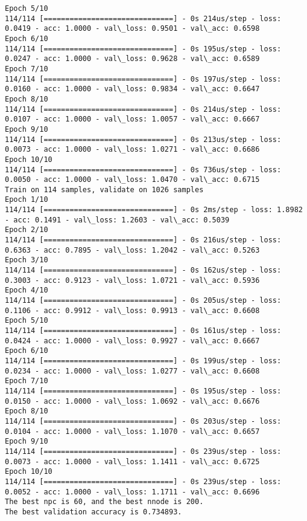 \documentclass[11pt]{article}
\begin{document}
\begin{Verbatim}[commandchars=\\\{\}]
Epoch 5/10
114/114 [==============================] - 0s 214us/step - loss: 0.0419 - acc: 1.0000 - val\_loss: 0.9501 - val\_acc: 0.6598
Epoch 6/10
114/114 [==============================] - 0s 195us/step - loss: 0.0247 - acc: 1.0000 - val\_loss: 0.9628 - val\_acc: 0.6589
Epoch 7/10
114/114 [==============================] - 0s 197us/step - loss: 0.0160 - acc: 1.0000 - val\_loss: 0.9834 - val\_acc: 0.6647
Epoch 8/10
114/114 [==============================] - 0s 214us/step - loss: 0.0107 - acc: 1.0000 - val\_loss: 1.0057 - val\_acc: 0.6667
Epoch 9/10
114/114 [==============================] - 0s 213us/step - loss: 0.0073 - acc: 1.0000 - val\_loss: 1.0271 - val\_acc: 0.6686
Epoch 10/10
114/114 [==============================] - 0s 736us/step - loss: 0.0050 - acc: 1.0000 - val\_loss: 1.0470 - val\_acc: 0.6715
Train on 114 samples, validate on 1026 samples
Epoch 1/10
114/114 [==============================] - 0s 2ms/step - loss: 1.8982 - acc: 0.1491 - val\_loss: 1.2603 - val\_acc: 0.5039
Epoch 2/10
114/114 [==============================] - 0s 216us/step - loss: 0.6363 - acc: 0.7895 - val\_loss: 1.2042 - val\_acc: 0.5263
Epoch 3/10
114/114 [==============================] - 0s 162us/step - loss: 0.3003 - acc: 0.9123 - val\_loss: 1.0721 - val\_acc: 0.5936
Epoch 4/10
114/114 [==============================] - 0s 205us/step - loss: 0.1106 - acc: 0.9912 - val\_loss: 0.9913 - val\_acc: 0.6608
Epoch 5/10
114/114 [==============================] - 0s 161us/step - loss: 0.0424 - acc: 1.0000 - val\_loss: 0.9927 - val\_acc: 0.6667
Epoch 6/10
114/114 [==============================] - 0s 199us/step - loss: 0.0234 - acc: 1.0000 - val\_loss: 1.0277 - val\_acc: 0.6608
Epoch 7/10
114/114 [==============================] - 0s 195us/step - loss: 0.0150 - acc: 1.0000 - val\_loss: 1.0692 - val\_acc: 0.6676
Epoch 8/10
114/114 [==============================] - 0s 203us/step - loss: 0.0104 - acc: 1.0000 - val\_loss: 1.1070 - val\_acc: 0.6657
Epoch 9/10
114/114 [==============================] - 0s 239us/step - loss: 0.0073 - acc: 1.0000 - val\_loss: 1.1411 - val\_acc: 0.6725
Epoch 10/10
114/114 [==============================] - 0s 239us/step - loss: 0.0052 - acc: 1.0000 - val\_loss: 1.1711 - val\_acc: 0.6696
The best npc is 60, and the best nnode is 200.
The best validation accuracy is 0.734893.

    \end{Verbatim}
\end{document}
